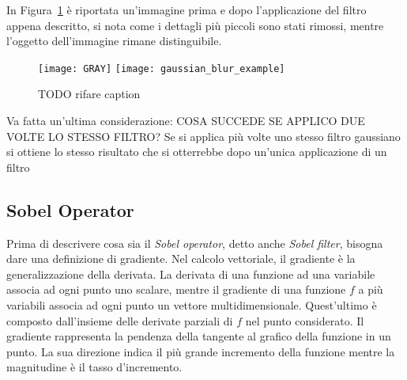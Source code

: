 
In Figura~\ref{fig:gaussian_blur_example} è riportata un'immagine prima e dopo l'applicazione del filtro appena descritto, si nota come i dettagli più piccoli sono stati rimossi, mentre l'oggetto dell'immagine rimane distinguibile.

\begin{figure}[ht] %
  \begin{center}
    \texttt{[image: GRAY]}
    \texttt{[image: gaussian\_blur\_example]}
    \caption{TODO rifare caption}
    \label{fig:gaussian_blur_example}
  \end{center}
\end{figure}

Va fatta un'ultima considerazione: COSA SUCCEDE SE APPLICO DUE VOLTE LO STESSO FILTRO?
Se si applica più volte uno stesso filtro gaussiano si ottiene lo stesso risultato che si otterrebbe dopo un'unica applicazione di un filtro 





\clearpage
\subsection {Sobel Operator}
Prima di descrivere cosa sia il \textit{Sobel operator}, detto anche \textit{Sobel filter}, bisogna dare una definizione di gradiente.
Nel calcolo vettoriale, il gradiente è la generalizzazione della derivata.
La derivata di una funzione ad una variabile associa ad ogni punto uno scalare, mentre il gradiente di una funzione $f$ a più variabili associa ad ogni punto un vettore multidimensionale.
Quest'ultimo è composto dall'insieme delle derivate parziali di $f$ nel punto considerato.
Il gradiente rappresenta la pendenza della tangente al grafico della funzione in un punto.
La sua direzione indica il più grande incremento della funzione mentre la magnitudine è il tasso d'incremento.

